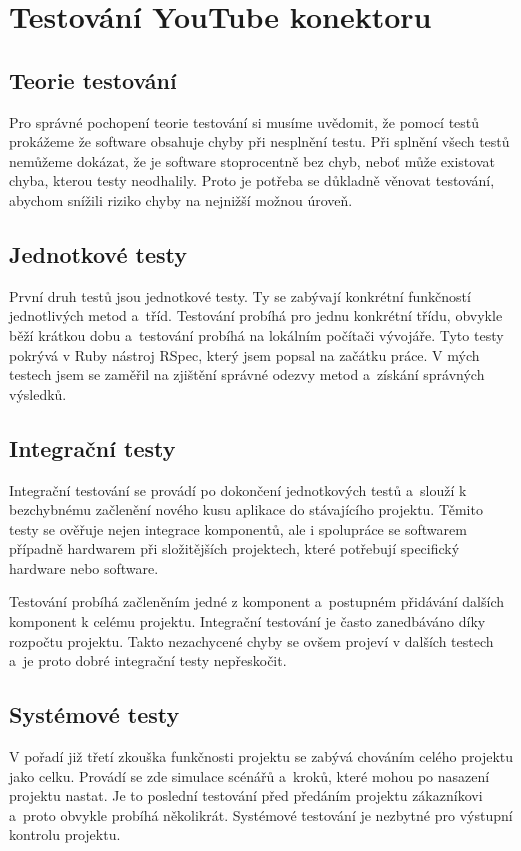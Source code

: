 \section{Testování YouTube konektoru}
\subsection{Teorie testování}
\par Pro správné pochopení teorie testování\cite{si1} si musíme uvědomit, že pomocí testů prokážeme že software obsahuje chyby při nesplnění testu. Při splnění všech testů nemůžeme dokázat, že je software stoprocentně bez chyb, neboť může existovat chyba, kterou testy neodhalily. Proto je potřeba se důkladně věnovat testování, abychom snížili riziko chyby na nejnižší možnou úroveň.
\subsection{Jednotkové testy}
\par První druh testů jsou jednotkové testy\cite{si1}. Ty se zabývají konkrétní funkčností jednotlivých metod a~tříd. Testování probíhá pro jednu konkrétní třídu, obvykle běží krátkou dobu a~testování probíhá na lokálním počítači vývojáře. Tyto testy pokrývá v Ruby nástroj RSpec, který jsem popsal na začátku práce. V mých testech jsem se zaměřil na zjištění správné odezvy metod a~získání správných výsledků.
\subsection{Integrační testy}
\par Integrační testování\cite{si1} se provádí po dokončení jednotkových testů a~slouží k bezchybnému začlenění nového kusu aplikace do stávajícího projektu. Těmito testy se ověřuje nejen integrace komponentů, ale i spolupráce se softwarem případně hardwarem při složitějších projektech, které potřebují specifický hardware nebo software. 
\par Testování probíhá začleněním jedné z komponent a~postupném přidávání dalších komponent k celému projektu. Integrační testování je často zanedbáváno díky rozpočtu projektu. Takto nezachycené chyby se ovšem projeví v dalších testech a~je proto dobré integrační testy nepřeskočit.
\subsection{Systémové testy}
\par V pořadí již třetí zkouška funkčnosti projektu se zabývá chováním celého projektu jako celku. Provádí se zde simulace scénářů a~kroků, které mohou po nasazení projektu nastat. Je to poslední testování před předáním projektu zákazníkovi a~proto obvykle probíhá několikrát. Systémové testování\cite{si1} je nezbytné pro výstupní kontrolu projektu.
